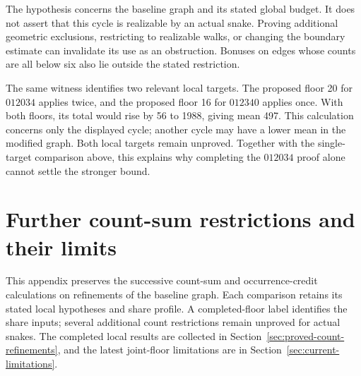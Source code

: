 \documentclass[11pt,a4paper]{article}
\theoremstyle{definition}
\theoremstyle{remark}
\begin{document}
The hypothesis concerns the baseline graph and its stated global budget.
It does not assert that this cycle is realizable by an actual snake. Proving
additional geometric exclusions, restricting to realizable walks, or changing
the boundary estimate can invalidate its use as an obstruction. Bonuses on
edges whose counts are all below six also lie outside the stated restriction.

The same witness identifies two relevant local targets. The proposed floor
20 for $012034$ applies twice, and the proposed floor 16 for $012340$ applies
once. With both floors, its total would rise by 56 to 1988, giving mean 497.
This calculation concerns only the displayed cycle; another cycle may have
a lower mean in the modified graph. Both local targets remain unproved.
Together with the single-target comparison above, this explains why completing
the $012034$ proof alone cannot settle the stronger bound.

\section{Further count-sum restrictions and their limits}\label{sec:sum-refinements}
This appendix preserves the successive count-sum and occurrence-credit
calculations on refinements of the baseline graph. Each comparison retains
its stated local hypotheses and share profile. A completed-floor label
identifies the share inputs; several additional count restrictions remain
unproved for actual snakes. The completed local results are collected in
Section~\ref{sec:proved-count-refinements}, and the latest joint-floor
limitations are in Section~\ref{sec:current-limitations}.
\end{document}
